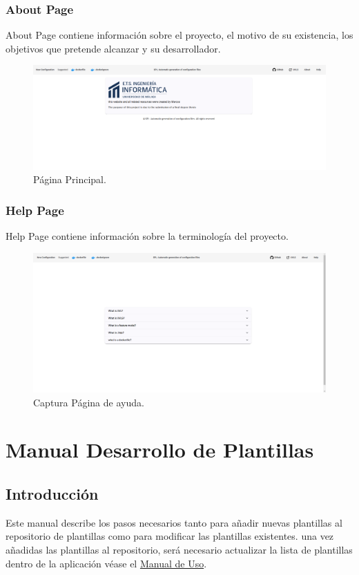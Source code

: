 \documentclass[12pt, a4paper, twoside]{article}
\begin{document}
\begin{umaappendices}
	\subsubsection{About Page}
	About Page contiene información sobre el proyecto, el motivo de su existencia, los objetivos que pretende alcanzar y su desarrollador.
	\begin{figure}[h]
		\centering
			\includegraphics[width=1\textwidth]{Aboutpage.png}
		\caption{Página Principal.}
	\end{figure}

	\subsubsection{Help Page}
	Help Page contiene información sobre la terminología del proyecto. 
	\begin{figure}[h]
		\centering
			\includegraphics[width=1\textwidth]{HelpPage.png}
		\caption{Captura Página de ayuda.}
	\end{figure}




	\section{Manual Desarrollo de Plantillas}
	\label{sec:Manual de Desarrollo}
	\subsection{Introducción}
	Este manual describe los pasos necesarios tanto para añadir nuevas plantillas al repositorio de plantillas \cite{m4rdom_templates} como para modificar las plantillas existentes.
	una vez añadidas las plantillas al repositorio, será necesario actualizar la lista de plantillas dentro de la aplicación véase el \hyperref[sec:Actualizar Plantillas]{Manual de Uso}.

\end{umaappendices}
\end{document}
